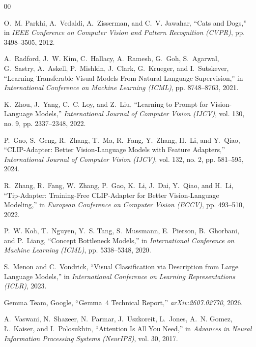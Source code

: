 \documentclass[conference]{IEEEtran}
\begin{document}
\vspace{-3pt}
\begin{thebibliography}{00}
\footnotesize\linespread{1.02}\selectfont
\setlength{\itemsep}{0.5pt plus 0.2pt minus 0.1pt}
\setlength{\parsep}{0pt}

O.~M. Parkhi, A.~Vedaldi, A.~Zisserman, and C.~V. Jawahar, ``Cats and Dogs,'' in \emph{IEEE Conference on Computer Vision and Pattern Recognition (CVPR)}, pp. 3498--3505, 2012.

A.~Radford, J.~W. Kim, C.~Hallacy, A.~Ramesh, G.~Goh, S.~Agarwal, G.~Sastry, A.~Askell, P.~Mishkin, J.~Clark, G.~Krueger, and I.~Sutskever, ``Learning Transferable Visual Models From Natural Language Supervision,'' in \emph{International Conference on Machine Learning (ICML)}, pp. 8748--8763, 2021.

K.~Zhou, J.~Yang, C.~C. Loy, and Z.~Liu, ``Learning to Prompt for Vision-Language Models,'' \emph{International Journal of Computer Vision (IJCV)}, vol. 130, no. 9, pp. 2337--2348, 2022.

P.~Gao, S.~Geng, R.~Zhang, T.~Ma, R.~Fang, Y.~Zhang, H.~Li, and Y.~Qiao, ``CLIP-Adapter: Better Vision-Language Models with Feature Adapters,'' \emph{International Journal of Computer Vision (IJCV)}, vol. 132, no. 2, pp. 581--595, 2024.

R.~Zhang, R.~Fang, W.~Zhang, P.~Gao, K.~Li, J.~Dai, Y.~Qiao, and H.~Li, ``Tip-Adapter: Training-Free CLIP-Adapter for Better Vision-Language Modeling,'' in \emph{European Conference on Computer Vision (ECCV)}, pp. 493--510, 2022.

P.~W. Koh, T.~Nguyen, Y.~S. Tang, S.~Mussmann, E.~Pierson, B.~Ghorbani, and P.~Liang, ``Concept Bottleneck Models,'' in \emph{International Conference on Machine Learning (ICML)}, pp. 5338--5348, 2020.

S.~Menon and C.~Vondrick, ``Visual Classification via Description from Large Language Models,'' in \emph{International Conference on Learning Representations (ICLR)}, 2023.

Gemma Team, Google, ``Gemma~4 Technical Report,'' \emph{arXiv:2607.02770}, 2026.

A.~Vaswani, N.~Shazeer, N.~Parmar, J.~Uszkoreit, L.~Jones, A.~N. Gomez, \L.~Kaiser, and I.~Polosukhin, ``Attention Is All You Need,'' in \emph{Advances in Neural Information Processing Systems (NeurIPS)}, vol. 30, 2017.


\end{thebibliography}
\end{document}
